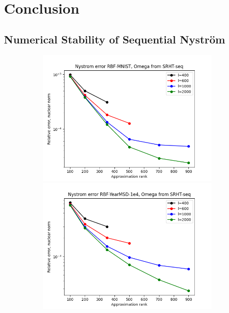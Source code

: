 \documentclass{article}
\theoremstyle{definition}
\begin{document}
\section{Conclusion}

\clearpage{}
\printbibliography{} %
\clearpage
\begin{appendices}
\section{Numerical Stability of Sequential Nyström}
\begin{figure}
\centering
\hfill\begin{subfigure}[t]{\textwidth+20pt\relax}
    \includegraphics[width=\dimexpr\linewidth-20pt\relax]{plots/relerror/relerror_RBF-MNIST_SRHT-seq.png}
    \includegraphics[width=\dimexpr\linewidth-20pt\relax]{plots/relerror/relerror_RBF-YearMSD-1e4_SRHT-seq.png}

\end{subfigure}
\end{figure}
\end{appendices}
\end{document}
